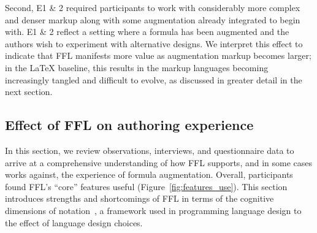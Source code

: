 Second, E1 \& 2 required participants to work with considerably more complex and denser markup along with some augmentation already integrated to begin with. E1 \& 2 reflect a setting where a formula has been augmented and the authors wish to experiment with alternative designs. We interpret this effect to indicate that FFL manifests more value as augmentation markup becomes larger; in the LaTeX baseline, this results in the markup languages becoming increasingly tangled and difficult to evolve, as discussed in greater detail in the next section.

\subsection{Effect of FFL on authoring experience}

In this section, we review observations, interviews, and questionnaire data to arrive at a comprehensive understanding of how FFL supports, and in some cases works against, the experience of formula augmentation. Overall, participants found FFL's ``core'' features useful (Figure~\ref{fig:features_use}). This section introduces strengths and shortcomings of FFL in terms of the cognitive dimensions of notation~\cite{ref:blackwell2003notational}, a framework used in programming language design to  the effect of language design choices.

